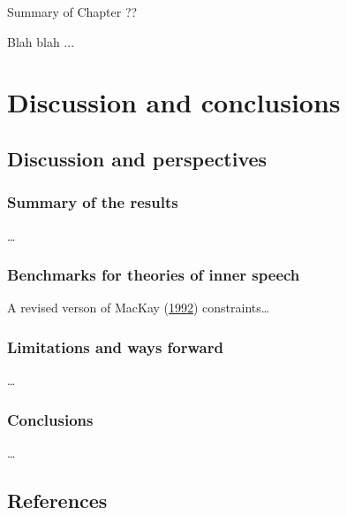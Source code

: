 \documentclass[a4paper,12pt,twoside,openright,oldfontcommands]{memoir}
\newcommand\getcurrentref[1]{
 \ifnumequal{\value{#1}}{0}
  {??}
  {\the\value{#1}}
}
\begin{document}
\begin{summary}{Summary of Chapter\getcurrentref{chapter}}

Blah blah ...

\end{summary}

\part{Discussion and
conclusions}\label{part-discussion-and-conclusions}

\chapter{Discussion and perspectives}\label{discussion-and-perspectives}

\section{Summary of the results}\label{summary-of-the-results}

\ldots{}

\section{Benchmarks for theories of inner
speech}\label{benchmarks-for-theories-of-inner-speech}

A revised verson of MacKay
(\protect\hyperlink{ref-mackay_constraints_1992}{1992})
constraints\ldots{}

\section{Limitations and ways
forward}\label{limitations-and-ways-forward}

\ldots{}

\section{Conclusions}\label{conclusions}

\ldots{}

\chapter*{References}\label{references}

\noindent
\setlength{\parindent}{-0.20in} \setlength{\leftskip}{0.20in}
\setlength{\parskip}{8pt}
\end{document}
